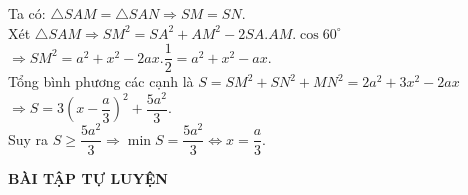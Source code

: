 \begin{vd}
{\begin{enumerate}
			Ta có: $\triangle SAM=\triangle SAN\Rightarrow SM=SN$.\\
			Xét $\triangle SAM\Rightarrow SM^2=SA^2+AM^2-2SA.AM.\cos 60^\circ$\\
			$\Rightarrow SM^2=a^2+x^2-2ax.\dfrac{1}{2}=a^2+x^2-ax.$\\
			Tổng bình phương các cạnh là $S=SM^2+SN^2+MN^2=2a^2+3x^2-2ax$\\
			$\Rightarrow S=3\left(x-\dfrac{a}{3}\right)^2+\dfrac{5a^2}{3}.$\\
			Suy ra $S\ge \dfrac{5a^2}{3}\Rightarrow \min S=\dfrac{5a^2}{3}\Leftrightarrow x=\dfrac{a}{3}.$
		\end{enumerate}
	}
\end{vd}

\begin{center}
	\textbf{BÀI TẬP TỰ LUYỆN}
\end{center}
\setcounter{bt}{0}
